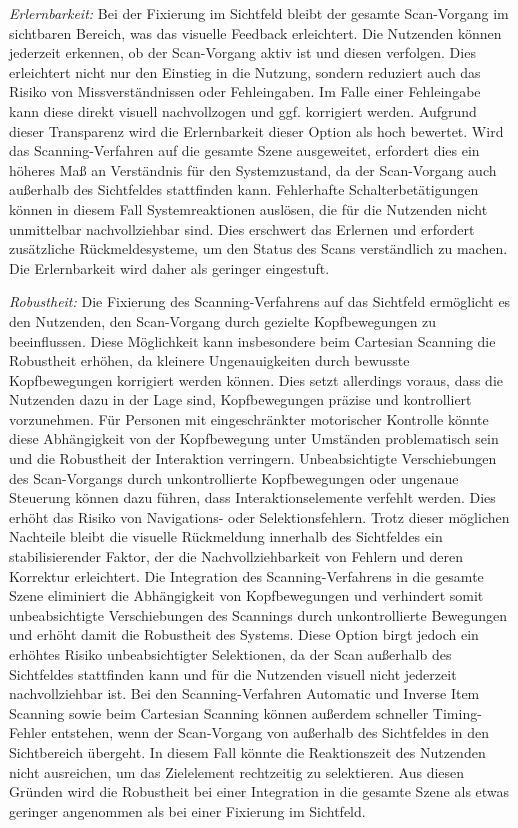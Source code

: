 \textit{Erlernbarkeit:} 
Bei der Fixierung im Sichtfeld bleibt der gesamte Scan-Vorgang im sichtbaren Bereich, was das visuelle Feedback erleichtert. Die Nutzenden können jederzeit erkennen, ob der Scan-Vorgang aktiv ist und diesen verfolgen. Dies erleichtert nicht nur den Einstieg in die Nutzung, sondern reduziert auch das Risiko von Missverständnissen oder Fehleingaben. Im Falle einer Fehleingabe kann diese direkt visuell nachvollzogen und ggf. korrigiert werden. Aufgrund dieser Transparenz wird die Erlernbarkeit dieser Option als hoch bewertet.
Wird das Scanning-Verfahren auf die gesamte Szene ausgeweitet, erfordert dies ein höheres Maß an Verständnis für den Systemzustand, da der Scan-Vorgang auch außerhalb des Sichtfeldes stattfinden kann. Fehlerhafte Schalterbetätigungen können in diesem Fall Systemreaktionen auslösen, die für die Nutzenden nicht unmittelbar nachvollziehbar sind. Dies erschwert das Erlernen und erfordert zusätzliche Rückmeldesysteme, um den Status des Scans verständlich zu machen. Die Erlernbarkeit wird daher als geringer eingestuft. 

\textit{Robustheit:}
Die Fixierung des Scanning-Verfahrens auf das Sichtfeld ermöglicht es den Nutzenden, den Scan-Vorgang durch gezielte Kopfbewegungen zu beeinflussen. Diese Möglichkeit kann insbesondere beim Cartesian Scanning die Robustheit erhöhen, da kleinere Ungenauigkeiten durch bewusste Kopfbewegungen korrigiert werden können. Dies setzt allerdings voraus, dass die Nutzenden dazu in der Lage sind, Kopfbewegungen präzise und kontrolliert vorzunehmen. Für Personen mit eingeschränkter motorischer Kontrolle könnte diese Abhängigkeit von der Kopfbewegung unter Umständen problematisch sein und die Robustheit der Interaktion verringern. Unbeabsichtigte Verschiebungen des Scan-Vorgangs durch unkontrollierte Kopfbewegungen oder ungenaue Steuerung können dazu führen, dass Interaktionselemente verfehlt werden. Dies erhöht das Risiko von Navigations- oder Selektionsfehlern. Trotz dieser möglichen Nachteile bleibt die visuelle Rückmeldung innerhalb des Sichtfeldes ein stabilisierender Faktor, der die Nachvollziehbarkeit von Fehlern und deren Korrektur erleichtert. 
Die Integration des Scanning-Verfahrens in die gesamte Szene eliminiert die Abhängigkeit von Kopfbewegungen und verhindert somit unbeabsichtigte Verschiebungen des Scannings durch unkontrollierte Bewegungen und erhöht damit die Robustheit des Systems. Diese Option birgt jedoch ein erhöhtes Risiko unbeabsichtigter Selektionen, da der Scan außerhalb des Sichtfeldes stattfinden kann und für die Nutzenden visuell nicht jederzeit nachvollziehbar ist. Bei den Scanning-Verfahren Automatic und Inverse Item Scanning sowie beim Cartesian Scanning können außerdem schneller Timing-Fehler entstehen, wenn der Scan-Vorgang von außerhalb des Sichtfeldes in den Sichtbereich übergeht. In diesem Fall könnte die Reaktionszeit des Nutzenden nicht ausreichen, um das Zielelement rechtzeitig zu selektieren. Aus diesen Gründen wird die Robustheit bei einer Integration in die gesamte Szene als etwas geringer angenommen als bei einer Fixierung im Sichtfeld. 

